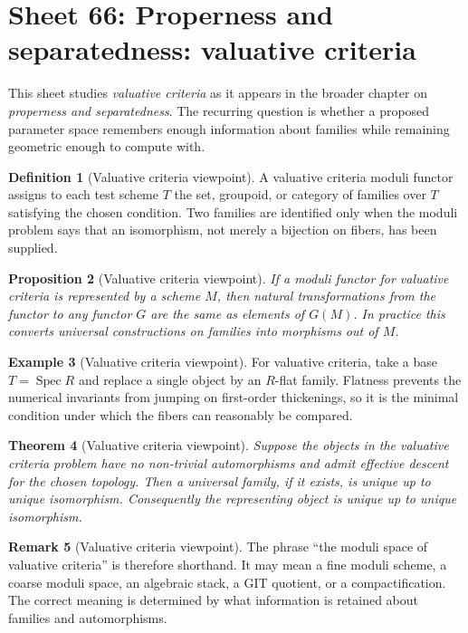 \documentclass[11pt]{amsart}
\newtheorem{theorem}{Theorem}[section]
\newtheorem{proposition}[theorem]{Proposition}
\theoremstyle{definition}
\newtheorem{definition}[theorem]{Definition}
\newtheorem{example}[theorem]{Example}
\newtheorem{remark}[theorem]{Remark}
\newcommand{\Spec}{\operatorname{Spec}}
\begin{document}
\section{Sheet 66: Properness and separatedness: valuative criteria}
This sheet studies \emph{valuative criteria} as it appears in the broader chapter on \emph{properness and separatedness}.  The recurring question is whether a proposed parameter space remembers enough information about families while remaining geometric enough to compute with.
\begin{definition}[Valuative criteria viewpoint]
A valuative criteria moduli functor assigns to each test scheme $T$ the set, groupoid, or category of families over $T$ satisfying the chosen condition.  Two families are identified only when the moduli problem says that an isomorphism, not merely a bijection on fibers, has been supplied.
\end{definition}
\begin{proposition}[Valuative criteria viewpoint]
If a moduli functor for valuative criteria is represented by a scheme $M$, then natural transformations from the functor to any functor $G$ are the same as elements of $G(M)$.  In practice this converts universal constructions on families into morphisms out of $M$.
\end{proposition}
\begin{example}[Valuative criteria viewpoint]
For valuative criteria, take a base $T=\Spec R$ and replace a single object by an $R$-flat family.  Flatness prevents the numerical invariants from jumping on first-order thickenings, so it is the minimal condition under which the fibers can reasonably be compared.
\end{example}
\begin{theorem}[Valuative criteria viewpoint]
Suppose the objects in the valuative criteria problem have no non-trivial automorphisms and admit effective descent for the chosen topology.  Then a universal family, if it exists, is unique up to unique isomorphism.  Consequently the representing object is unique up to unique isomorphism.
\end{theorem}
\begin{remark}[Valuative criteria viewpoint]
The phrase ``the moduli space of valuative criteria'' is therefore shorthand.  It may mean a fine moduli scheme, a coarse moduli space, an algebraic stack, a GIT quotient, or a compactification.  The correct meaning is determined by what information is retained about families and automorphisms.
\end{remark}
\end{document}
